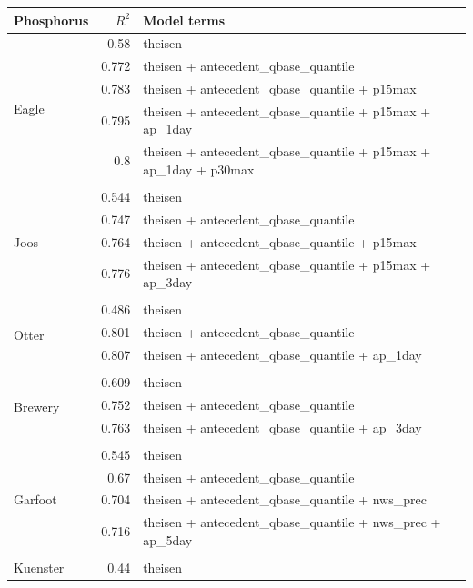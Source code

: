 \documentclass[10pt]{article}
\begin{document}
\begin{table}[h] \small
    \begin{center}
    \begin{tabular}{lrl}
    \textbf{Phosphorus} & $R^2$ & Model terms \\
    \hline
\multirow{6}{*}{Eagle} & 0.58 & theisen\\ 
 & 0.772 & theisen + antecedent\_qbase\_quantile\\ 
 & 0.783 & theisen + antecedent\_qbase\_quantile + p15max\\ 
 & 0.795 & theisen + antecedent\_qbase\_quantile + p15max + ap\_1day\\ 
 & 0.8 & theisen + antecedent\_qbase\_quantile + p15max + ap\_1day + p30max\\ 
\vspace{2mm}\\ \multirow{5}{*}{Joos} & 0.544 & theisen\\ 
 & 0.747 & theisen + antecedent\_qbase\_quantile\\ 
 & 0.764 & theisen + antecedent\_qbase\_quantile + p15max\\ 
 & 0.776 & theisen + antecedent\_qbase\_quantile + p15max + ap\_3day\\ 
\vspace{2mm}\\ \multirow{4}{*}{Otter} & 0.486 & theisen\\ 
 & 0.801 & theisen + antecedent\_qbase\_quantile\\ 
 & 0.807 & theisen + antecedent\_qbase\_quantile + ap\_1day\\ 
\vspace{2mm}\\ \multirow{4}{*}{Brewery} & 0.609 & theisen\\ 
 & 0.752 & theisen + antecedent\_qbase\_quantile\\ 
 & 0.763 & theisen + antecedent\_qbase\_quantile + ap\_3day\\ 
\vspace{2mm}\\ \multirow{5}{*}{Garfoot} & 0.545 & theisen\\ 
 & 0.67 & theisen + antecedent\_qbase\_quantile\\ 
 & 0.704 & theisen + antecedent\_qbase\_quantile + nws\_prec\\ 
 & 0.716 & theisen + antecedent\_qbase\_quantile + nws\_prec + ap\_5day\\ 
\vspace{2mm}\\ \multirow{4}{*}{Kuenster} & 0.44 & theisen\\ 

\end{tabular}
\end{center}
\end{table}
\end{document}

